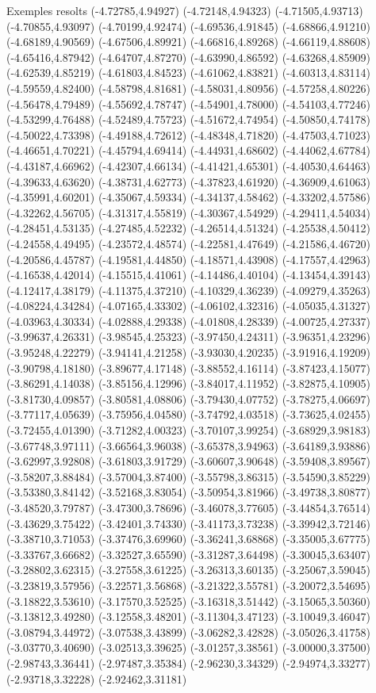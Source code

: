 \documentclass[11pt,a4paper]{article}
\begin{document}
\begin{fmex}{Exemples resolts}
(-4.72785,4.94927) (-4.72148,4.94323) (-4.71505,4.93713) (-4.70855,4.93097) (-4.70199,4.92474) (-4.69536,4.91845) (-4.68866,4.91210) (-4.68189,4.90569) (-4.67506,4.89921) (-4.66816,4.89268) (-4.66119,4.88608) (-4.65416,4.87942) (-4.64707,4.87270) (-4.63990,4.86592) (-4.63268,4.85909) (-4.62539,4.85219) (-4.61803,4.84523) (-4.61062,4.83821) (-4.60313,4.83114) (-4.59559,4.82400) (-4.58798,4.81681) (-4.58031,4.80956) (-4.57258,4.80226) (-4.56478,4.79489) (-4.55692,4.78747) (-4.54901,4.78000) (-4.54103,4.77246) (-4.53299,4.76488) (-4.52489,4.75723) (-4.51672,4.74954) (-4.50850,4.74178) (-4.50022,4.73398) (-4.49188,4.72612) (-4.48348,4.71820) (-4.47503,4.71023) (-4.46651,4.70221) (-4.45794,4.69414) (-4.44931,4.68602) (-4.44062,4.67784) (-4.43187,4.66962) (-4.42307,4.66134) (-4.41421,4.65301) (-4.40530,4.64463) (-4.39633,4.63620) (-4.38731,4.62773) (-4.37823,4.61920) (-4.36909,4.61063) (-4.35991,4.60201) (-4.35067,4.59334) (-4.34137,4.58462) (-4.33202,4.57586) (-4.32262,4.56705) (-4.31317,4.55819) (-4.30367,4.54929) (-4.29411,4.54034) (-4.28451,4.53135) (-4.27485,4.52232) (-4.26514,4.51324) (-4.25538,4.50412) (-4.24558,4.49495) (-4.23572,4.48574) (-4.22581,4.47649) (-4.21586,4.46720) (-4.20586,4.45787) (-4.19581,4.44850) (-4.18571,4.43908) (-4.17557,4.42963) (-4.16538,4.42014) (-4.15515,4.41061) (-4.14486,4.40104) (-4.13454,4.39143) (-4.12417,4.38179) (-4.11375,4.37210) (-4.10329,4.36239) (-4.09279,4.35263) (-4.08224,4.34284) (-4.07165,4.33302) (-4.06102,4.32316) (-4.05035,4.31327) (-4.03963,4.30334) (-4.02888,4.29338) (-4.01808,4.28339) (-4.00725,4.27337) (-3.99637,4.26331) (-3.98545,4.25323) (-3.97450,4.24311) (-3.96351,4.23296) (-3.95248,4.22279) (-3.94141,4.21258) (-3.93030,4.20235) (-3.91916,4.19209) (-3.90798,4.18180) (-3.89677,4.17148) (-3.88552,4.16114) (-3.87423,4.15077) (-3.86291,4.14038) (-3.85156,4.12996) (-3.84017,4.11952) (-3.82875,4.10905) (-3.81730,4.09857) (-3.80581,4.08806) (-3.79430,4.07752) (-3.78275,4.06697) (-3.77117,4.05639) (-3.75956,4.04580) (-3.74792,4.03518) (-3.73625,4.02455) (-3.72455,4.01390) (-3.71282,4.00323) (-3.70107,3.99254) (-3.68929,3.98183) (-3.67748,3.97111) (-3.66564,3.96038) (-3.65378,3.94963) (-3.64189,3.93886) (-3.62997,3.92808) (-3.61803,3.91729) (-3.60607,3.90648) (-3.59408,3.89567) (-3.58207,3.88484) (-3.57004,3.87400) (-3.55798,3.86315) (-3.54590,3.85229) (-3.53380,3.84142) (-3.52168,3.83054) (-3.50954,3.81966) (-3.49738,3.80877) (-3.48520,3.79787) (-3.47300,3.78696) (-3.46078,3.77605) (-3.44854,3.76514) (-3.43629,3.75422) (-3.42401,3.74330) (-3.41173,3.73238) (-3.39942,3.72146) (-3.38710,3.71053) (-3.37476,3.69960) (-3.36241,3.68868) (-3.35005,3.67775) (-3.33767,3.66682) (-3.32527,3.65590) (-3.31287,3.64498) (-3.30045,3.63407) (-3.28802,3.62315) (-3.27558,3.61225) (-3.26313,3.60135) (-3.25067,3.59045) (-3.23819,3.57956) (-3.22571,3.56868) (-3.21322,3.55781) (-3.20072,3.54695) (-3.18822,3.53610) (-3.17570,3.52525) (-3.16318,3.51442) (-3.15065,3.50360) (-3.13812,3.49280) (-3.12558,3.48201) (-3.11304,3.47123) (-3.10049,3.46047) (-3.08794,3.44972) (-3.07538,3.43899) (-3.06282,3.42828) (-3.05026,3.41758) (-3.03770,3.40690) (-3.02513,3.39625) (-3.01257,3.38561) (-3.00000,3.37500) (-2.98743,3.36441) (-2.97487,3.35384) (-2.96230,3.34329) (-2.94974,3.33277) (-2.93718,3.32228) (-2.92462,3.31181) 
\end{fmex}
\end{document}
